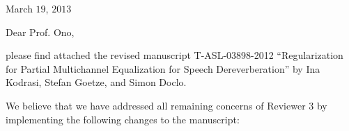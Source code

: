 \documentclass[11pt, a4paper]{article}
\begin{document}


March $19$, $2013$
\vspace{0.3cm}

Dear Prof. Ono,

\vspace{0.3cm}

please find attached the revised manuscript T-ASL-03898-2012 ``Regularization for Partial Multichannel Equalization for Speech Dereverberation'' by Ina Kodrasi, Stefan Goetze, and Simon Doclo.

\vspace{0.3cm}

We believe that we have addressed all remaining concerns of Reviewer $3$ by implementing the following changes to the manuscript:
\end{document}
